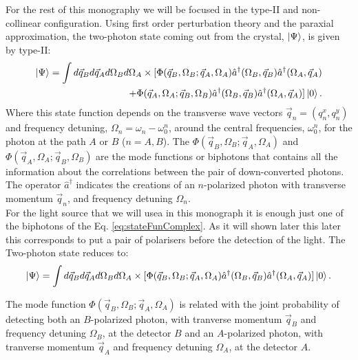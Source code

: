 For the rest of this monography we will be focused in the type-II and non-collinear configuration. Using first order perturbation theory  and the paraxial approximation, the two-photon state
 coming out from the crystal, $\ket{\Psi}$, is given by \cite{omar} type-II:
\begin{equation}
\begin{split}
\label{eq:stateFunComplex}
\ket{\Psi}=\int d\vec{q}_B d\vec{q}_A d\Omega_B d\Omega_A 
\times [\Phi(\vec{q}_B,\Omega_B;\vec{q}_A,\Omega_A) \hat{a}^{\dagger} (\Omega_B,\vec{q}_B) \hat{a}^{\dagger}(\Omega_A,\vec{q}_A) \\
+ \Phi(\vec{q}_A,\Omega_A;\vec{q}_B,\Omega_B) \hat{a}^{\dagger}(\Omega_B,\vec{q}_B) \hat{a}^{\dagger}(\Omega_A,\vec{q}_A)]   \ket{0}.  
\end{split}
\end{equation}
Where this state function depends on the transverse wave vectors $\vec{q}_n=(q_n^x,q_n^y)$ and frequency detuning, $\Omega_n=\omega_n-\omega_0^n$, 
around the central frequencies, $\omega_0^n$, for the photon at the path $A$ or $B$ ($n=A,B$).
The $\Phi(\vec{q}_B,\Omega_B;\vec{q}_A,\Omega_A)$ and $\Phi(\vec{q}_A,\Omega_A;\vec{q}_B,\Omega_B)$
are the mode functions or biphotons that contains all the information about the correlations
between the pair of down-converted photons. The operator $\hat{a}^{\dagger}$ indicates the creations of an $n$-polarized photon with transverse momentum $\vec{q}_n$, 
and frequency detuning $\Omega_n$. \\

For the light source that we will usea in this monograph it is enough just one of the biphotons of the Eq. \ref{eq:stateFunComplex}. 
As it will shown later this later this corresponds to put a pair of polarisers before the detection of the light. The Two-photon state reduces to:
\begin{equation}
\label{eq:stateFun}
\ket{\Psi}=\int d\vec{q}_B d\vec{q}_A d\Omega_B d\Omega_A 
\times [\Phi(\vec{q}_B,\Omega_B;\vec{q}_A,\Omega_A) \hat{a}^{\dagger} (\Omega_B,\vec{q}_B) \hat{a}^{\dagger}(\Omega_A,\vec{q}_A) 
] \ket{0}.  
\end{equation}

The mode function  $\Phi(\vec{q}_B,\Omega_B;\vec{q}_A,\Omega_A)$ is related with the joint probability of detecting both an $B$-polarized
photon, with tranverse momentum $\vec{q}_B$ and frequency detuning $\Omega_B$, at the detector $B$ 
and an $A$-polarized
photon, with tranverse momentum $\vec{q}_A$ and frequency detuning $\Omega_A$, at the detector $A$. 

